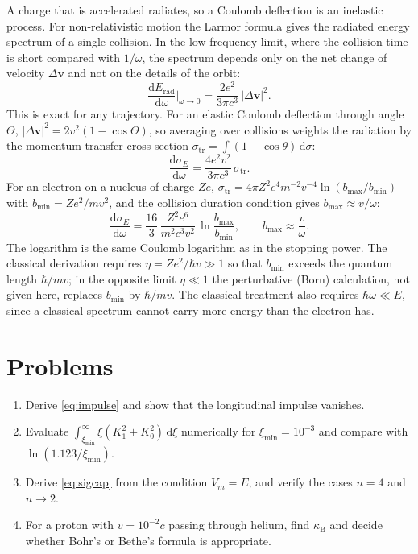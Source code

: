 \documentclass[11pt,a4paper]{book}
\numberwithin{equation}{chapter}
\newcommand{\dd}{\mathrm{d}}
\newcommand{\kB}{\kappa_{\mathrm B}}
\begin{document}
A charge that is accelerated radiates, so a Coulomb deflection is an inelastic
process. For non-relativistic motion the Larmor formula gives the radiated
energy spectrum of a single collision. In the low-frequency limit, where the
collision time is short compared with $1/\omega$, the spectrum depends only on the
net change of velocity $\Delta\bm v$ and not on the details of the orbit:
\begin{equation}\label{eq:soft-nr}
  \frac{\dd E_{\mathrm{rad}}}{\dd\omega}\bigg|_{\omega\to0}=
  \frac{2e^2}{3\pi c^3}\,|\Delta\bm v|^2 .
\end{equation}
This is exact for any trajectory. For an elastic Coulomb deflection through angle
$\Theta$, $|\Delta\bm v|^2=2v^2(1-\cos\Theta)$, so averaging over collisions
weights the radiation by the momentum-transfer cross section
$\sigma_{\mathrm{tr}}=\int(1-\cos\theta)\,\dd\sigma$:
\begin{equation}\label{eq:brems-sigtr}
  \frac{\dd\sigma_E}{\dd\omega}=\frac{4e^2v^2}{3\pi c^3}\,\sigma_{\mathrm{tr}} .
\end{equation}
For an electron on a nucleus of charge $Ze$, $\sigma_{\mathrm{tr}}=4\pi Z^2e^4
m^{-2}v^{-4}\ln(b_{\max}/b_{\min})$ with $b_{\min}=Ze^2/mv^2$, and the collision
duration condition gives $b_{\max}\approx v/\omega$:
\begin{equation}\label{eq:brems}
  \frac{\dd\sigma_E}{\dd\omega}=\frac{16}{3}\,\frac{Z^2e^6}{m^2c^3v^2}\,
  \ln\frac{b_{\max}}{b_{\min}},\qquad b_{\max}\approx\frac v\omega .
\end{equation}
The logarithm is the same Coulomb logarithm as in the stopping power. The
classical derivation requires $\eta=Ze^2/\hbar v\gg1$ so that $b_{\min}$ exceeds
the quantum length $\hbar/mv$; in the opposite limit $\eta\ll1$ the perturbative
(Born) calculation, not given here, replaces $b_{\min}$ by $\hbar/mv$. The
classical treatment also requires $\hbar\omega\ll E$, since a classical
spectrum cannot carry more energy than the electron has.

\section{Problems}
\begin{enumerate}
  \item Derive \eqref{eq:impulse} and show that the longitudinal impulse
        vanishes.
  \item Evaluate $\int_{\xi_{\min}}^\infty\xi(K_1^2+K_0^2)\,\dd\xi$ numerically for
        $\xi_{\min}=10^{-3}$ and compare with $\ln(1.123/\xi_{\min})$.
  \item Derive \eqref{eq:sigcap} from the condition $V_m=E$, and verify the cases
        $n=4$ and $n\to2$.
  \item For a proton with $v=10^{-2}c$ passing through helium, find $\kB$ and
        decide whether Bohr's or Bethe's formula is appropriate.
\end{enumerate}
\end{document}
